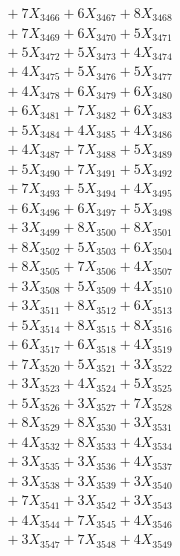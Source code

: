 \documentclass[a4paper,10pt]{article}
\begin{document}
{\begin{align}
&\;  + 7 X_{3466} + 6 X_{3467} + 8 X_{3468} \\[0.3ex]
&\;  + 7 X_{3469} + 6 X_{3470} + 5 X_{3471} \\[0.3ex]
&\;  + 5 X_{3472} + 5 X_{3473} + 4 X_{3474} \\[0.3ex]
&\;  + 4 X_{3475} + 5 X_{3476} + 5 X_{3477} \\[0.3ex]
&\;  + 4 X_{3478} + 6 X_{3479} + 6 X_{3480} \\[0.3ex]
&\;  + 6 X_{3481} + 7 X_{3482} + 6 X_{3483} \\[0.3ex]
&\;  + 5 X_{3484} + 4 X_{3485} + 4 X_{3486} \\[0.3ex]
&\;  + 4 X_{3487} + 7 X_{3488} + 5 X_{3489} \\[0.5ex]\allowbreak
&\;  + 5 X_{3490} + 7 X_{3491} + 5 X_{3492} \\[0.3ex]
&\;  + 7 X_{3493} + 5 X_{3494} + 4 X_{3495} \\[0.3ex]
&\;  + 6 X_{3496} + 6 X_{3497} + 5 X_{3498} \\[0.3ex]
&\;  + 3 X_{3499} + 8 X_{3500} + 8 X_{3501} \\[0.3ex]
&\;  + 8 X_{3502} + 5 X_{3503} + 6 X_{3504} \\[0.3ex]
&\;  + 8 X_{3505} + 7 X_{3506} + 4 X_{3507} \\[0.3ex]
&\;  + 3 X_{3508} + 5 X_{3509} + 4 X_{3510} \\[0.3ex]
&\;  + 3 X_{3511} + 8 X_{3512} + 6 X_{3513} \\[0.3ex]
&\;  + 5 X_{3514} + 8 X_{3515} + 8 X_{3516} \\[0.3ex]
&\;  + 6 X_{3517} + 6 X_{3518} + 4 X_{3519} \\[0.5ex]\allowbreak
&\;  + 7 X_{3520} + 5 X_{3521} + 3 X_{3522} \\[0.3ex]
&\;  + 3 X_{3523} + 4 X_{3524} + 5 X_{3525} \\[0.3ex]
&\;  + 5 X_{3526} + 3 X_{3527} + 7 X_{3528} \\[0.3ex]
&\;  + 8 X_{3529} + 8 X_{3530} + 3 X_{3531} \\[0.3ex]
&\;  + 4 X_{3532} + 8 X_{3533} + 4 X_{3534} \\[0.3ex]
&\;  + 3 X_{3535} + 3 X_{3536} + 4 X_{3537} \\[0.3ex]
&\;  + 3 X_{3538} + 3 X_{3539} + 3 X_{3540} \\[0.3ex]
&\;  + 7 X_{3541} + 3 X_{3542} + 3 X_{3543} \\[0.3ex]
&\;  + 4 X_{3544} + 7 X_{3545} + 4 X_{3546} \\[0.3ex]
&\;  + 3 X_{3547} + 7 X_{3548} + 4 X_{3549} \\[0.5ex]\allowbreak

\end{align}}
\end{document}
